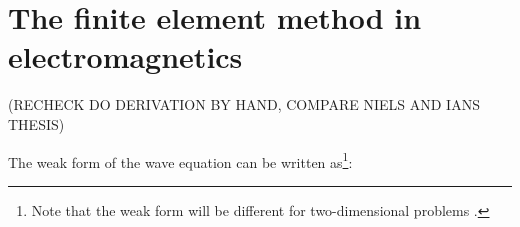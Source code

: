 

    \section{The finite element method in electromagnetics}\label{sec:fem}

    (RECHECK DO DERIVATION BY HAND, COMPARE NIELS AND IANS THESIS)

    The weak form of the wave equation can be written as\footnote{Note that the weak form will be different for two-dimensional problems \cite{ownpub0, ownpub2}.}:

